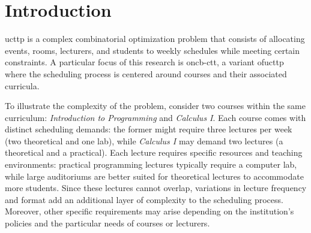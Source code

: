 \pretocmd{\chapter}{\glsresetall}{}{}


\chapter{Introduction}


\label{Introduction}


\ac{ucttp} is a complex combinatorial optimization problem that consists of allocating events, rooms, lecturers, and students to weekly schedules while meeting certain constraints. A particular focus of this research is on\ac{cb-ctt}, a variant of\ac{ucttp} where the scheduling process is centered around courses and their associated curricula. 

To illustrate the complexity of the problem, consider two courses within the same curriculum: \textit{Introduction to Programming} and \textit{Calculus I}. Each course comes with distinct scheduling demands: the former might require three lectures per week (two theoretical and one lab), while \textit{Calculus I} may demand two lectures (a theoretical and a practical). Each lecture requires specific resources and teaching environments: practical programming lectures typically require a computer lab, while large auditoriums are better suited for theoretical lectures to accommodate more students. Since these lectures cannot overlap, variations in lecture frequency and format add an additional layer of complexity to the scheduling process. %
Moreover, other specific requirements may arise depending on the institution’s policies and the particular needs of courses or lecturers.

